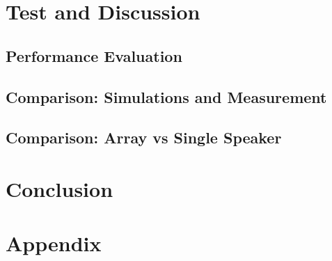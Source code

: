 
\part{Test and Discussion}\label{pt:test}
\graphicspath{{figures/tests/}}
	\chapter{Performance Evaluation}
	\chapter{Comparison: Simulations and Measurement}
	\chapter{Comparison: Array vs Single Speaker}


 
\part{Conclusion}\label{pt:conclusion}
% 
%

\glsresetall
\appendix %

 \graphicspath{{figures/appendix/}}
\part{Appendix}\label{pt:appendix}












